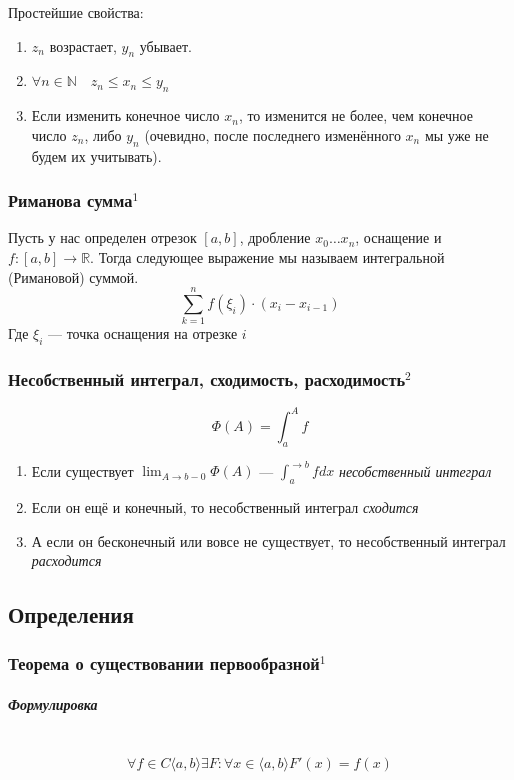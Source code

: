 \documentclass{article}
\let\vanillasubparagraph\subparagraph
\renewcommand{\subparagraph}[1]{\vanillasubparagraph{#1}\mbox{}\\}
\begin{document}
Простейшие свойства:
\begin{enumerate}
    \item $z_n$ возрастает, $y_n$ убывает.
    \item $\forall n \in \mathbb{N} \quad z_n \le x_n \le y_n$
    \item Если изменить конечное число $x_n$, то изменится не более, чем конечное число $z_n$, либо $y_n$ (очевидно, после последнего изменённого $x_n$ мы уже не будем их учитывать). 
\end{enumerate}


\subsubsection{Риманова сумма\texorpdfstring{$^1$}{}}
Пусть у нас определен отрезок $[a, b]$, дробление $x_0\ldots x_n$, оснащение и $f: [a, b] \rightarrow \mathbb{R}$. Тогда следующее выражение мы называем интегральной (Римановой) суммой.
$$
\sum_{k=1}^n f(\xi_i)\cdot(x_i-x_{i-1})
$$
Где $\xi_i$ --- точка оснащения на отрезке $i$

\subsubsection{Несобственный интеграл, сходимость, расходимость\texorpdfstring{$^2$}{}}

\[\Phi(A) = \int_a^A f\] 

\begin{enumerate}
    \item Если существует $\lim_{A \rightarrow b - 0}{\Phi(A)}$ --- $\int_a^{\rightarrow b}{f dx}$ \textit{несобственный интеграл}
    \item Если он ещё и конечный, то несобственный интеграл \textit{сходится}
    \item А если он бесконечный или вовсе не существует, то несобственный интеграл \textit{расходится}
\end{enumerate}
\newpage
\subsection{Определения}
\subsubsection{Теорема о существовании первообразной\texorpdfstring{$^1$}{}}
\subparagraph{Формулировка}
$$
\forall f\in C\langle a, b \rangle \exists F : \forall x \in \langle a, b \rangle F'(x) = f(x)
$$
\end{document}
